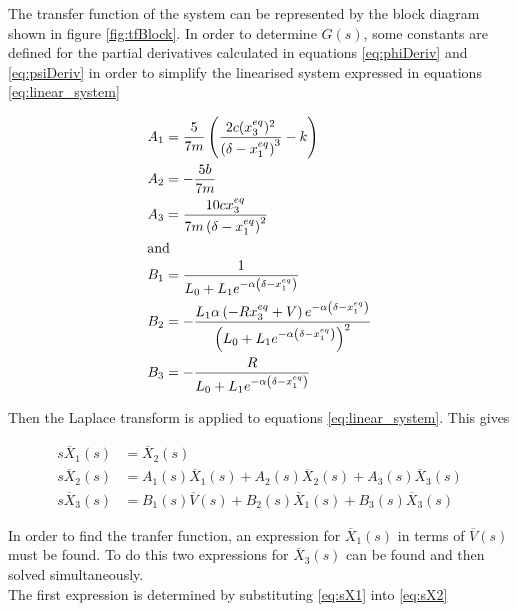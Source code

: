 \documentclass[a4paper,10pt,reqno]{amsart}
\numberwithin{equation}{section}
\begin{document}
The transfer function of the system can be represented by the block diagram shown in figure \ref{fig:tfBlock}. In order to determine $G(s)$, some constants are defined for the partial derivatives calculated in equations \ref{eq:phiDeriv} and \ref{eq:psiDeriv} in order to simplify the linearised system expressed in equations \ref{eq:linear_system}

\begin{subequations} \label{eq:SysLT}
    \begin{align}
         A_1 &= \frac{5}{7 m}\left(\frac{2 c (x_{3}^{eq})^{2}}{\left(\delta - x_{1}^{eq}\right)^{3}} - k\right) \label{eq:A1} \\
         A_2 &= -\frac{5 b}{7 m} \label{eq:A2} \\
         A_3 &= \frac{10 c x_{3}^{eq}}{7 m \left(\delta - x_{1}^{eq}\right)^{2}} \label{eq:A3} \\
         \intertext{and}
         B_1 &= \frac{1}{L_{0} + L_{1} e^{- \alpha \left(\delta - x_{1}^{eq}\right)}} \label{eq:B1} \\
         B_2 &= - \frac{L_{1} \alpha \left(- R x_{3}^{eq} + V\right) e^{- \alpha \left(\delta - x_{1}^{eq}\right)}}{\left(L_{0} + L_{1} e^{- \alpha \left(\delta - x_{1}^{eq}\right)}\right)^{2}} \label{eq:B2} \\
         B_3 &= - \frac{R}{L_{0} + L_{1} e^{- \alpha \left(\delta - x_{1}^{eq}\right)}} \label{eq:B3}
    \end{align}
\end{subequations}
\vspace{1pt}

Then the Laplace transform is applied to equations \ref{eq:linear_system}. This gives

\begin{subequations} \label{eq:SysLT}
    \begin{align}
         s\overline{X}_1(s) &= \overline{X}_2(s) \label{eq:sX1} \\
         s\overline{X}_2(s) &= A_1(s)\overline{X}_1(s) + A_2(s)\overline{X}_2(s) + A_3(s)\overline{X}_3(s) \label{eq:sX2} \\
         s\overline{X}_3(s) &= B_1(s)\overline{V}(s) + B_2(s)\overline{X}_1(s) + B_3(s)\overline{X}_3(s) \label{eq:sX4}
    \end{align}
\end{subequations}
\vspace{1pt}

In order to find the tranfer function, an expression for $\overline{X}_1(s)$ in terms of $\overline{V}(s)$ must be found. To do this two expressions for $\overline{X}_3(s)$ can be found and then solved simultaneously.\\
The first expression is determined by substituting \ref{eq:sX1} into \ref{eq:sX2}
\end{document}
